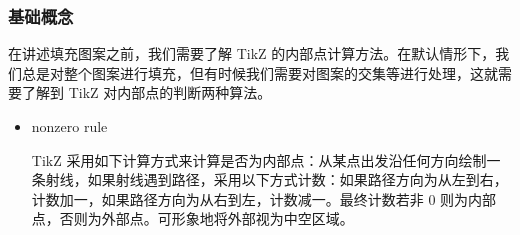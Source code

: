 \subsubsection{基础概念}

在讲述填充图案之前，我们需要了解 TikZ 的内部点计算方法。在默认情形下，我们总是对整个图案进行填充，但有时候我们需要对图案的交集等进行处理，这就需要了解到 TikZ 对内部点的判断两种算法。

\begin{itemize}
    \item nonzero rule
    
    TikZ 采用如下计算方式来计算是否为内部点：从某点出发沿任何方向绘制一条射线，如果射线遇到路径，采用以下方式计数：如果路径方向为从左到右，计数加一，如果路径方向为从右到左，计数减一。最终计数若非 0 则为内部点，否则为外部点。可形象地将外部视为中空区域。


\end{itemize}
